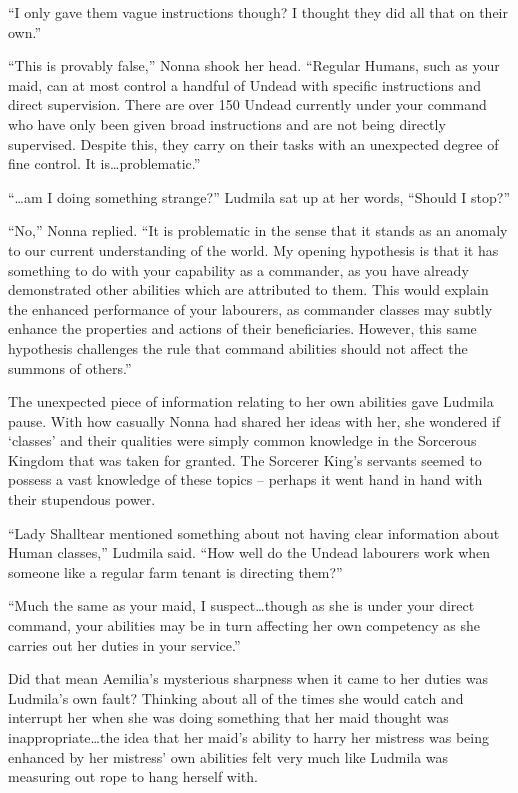  

“I only gave them vague instructions though? I thought they did all that on their own.”

 

“This is provably false,” Nonna shook her head. “Regular Humans, such as your maid, can at most control a handful of Undead with specific instructions and direct supervision. There are over 150 Undead currently under your command who have only been given broad instructions and are not being directly supervised. Despite this, they carry on their tasks with an unexpected degree of fine control. It is…problematic.”

 

“…am I doing something strange?” Ludmila sat up at her words, “Should I stop?”

 

“No,” Nonna replied. “It is problematic in the sense that it stands as an anomaly to our current understanding of the world. My opening hypothesis is that it has something to do with your capability as a commander, as you have already demonstrated other abilities which are attributed to them. This would explain the enhanced performance of your labourers, as commander classes may subtly enhance the properties and actions of their beneficiaries. However, this same hypothesis challenges the rule that command abilities should not affect the summons of others.”

 

The unexpected piece of information relating to her own abilities gave Ludmila pause. With how casually Nonna had shared her ideas with her, she wondered if ‘classes’ and their qualities were simply common knowledge in the Sorcerous Kingdom that was taken for granted. The Sorcerer King’s servants seemed to possess a vast knowledge of these topics – perhaps it went hand in hand with their stupendous power.

 

“Lady Shalltear mentioned something about not having clear information about Human classes,” Ludmila said. “How well do the Undead labourers work when someone like a regular farm tenant is directing them?”

 

“Much the same as your maid, I suspect…though as she is under your direct command, your abilities may be in turn affecting her own competency as she carries out her duties in your service.”

 

Did that mean Aemilia’s mysterious sharpness when it came to her duties was Ludmila’s own fault? Thinking about all of the times she would catch and interrupt her when she was doing something that her maid thought was inappropriate…the idea that her maid’s ability to harry her mistress was being enhanced by her mistress’ own abilities felt very much like Ludmila was measuring out rope to hang herself with.

